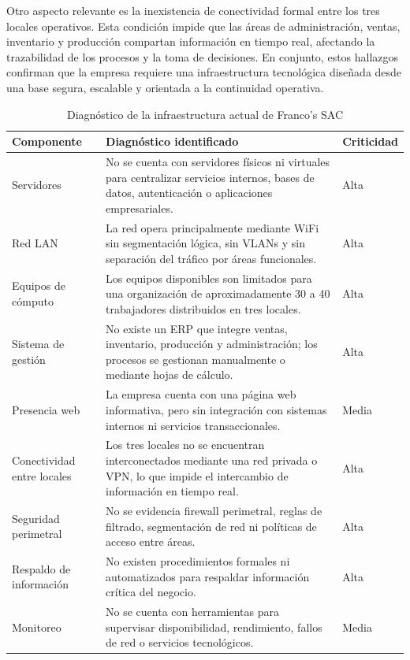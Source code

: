 \documentclass[11pt, a4paper, oneside]{report}
\begin{document}
Otro aspecto relevante es la inexistencia de conectividad formal entre los tres locales operativos. Esta condición impide que las áreas de administración, ventas, inventario y producción compartan información en tiempo real, afectando la trazabilidad de los procesos y la toma de decisiones. En conjunto, estos hallazgos confirman que la empresa requiere una infraestructura tecnológica diseñada desde una base segura, escalable y orientada a la continuidad operativa.

\begin{table}[htbp]
\centering
\caption{Diagnóstico de la infraestructura actual de Franco's SAC}
\small
\renewcommand{\arraystretch}{1.25}
\begin{tabularx}{\textwidth}{|M{3.2cm}|X|N{2cm}|}
\hline
{}
\textbf{Componente} & \textbf{Diagnóstico identificado} & \textbf{Criticidad} \\
\hline
Servidores & No se cuenta con servidores físicos ni virtuales para centralizar servicios internos, bases de datos, autenticación o aplicaciones empresariales. & Alta \\
\hline
Red LAN & La red opera principalmente mediante WiFi sin segmentación lógica, sin VLANs y sin separación del tráfico por áreas funcionales. & Alta \\
\hline
Equipos de cómputo & Los equipos disponibles son limitados para una organización de aproximadamente 30 a 40 trabajadores distribuidos en tres locales. & Alta \\
\hline
Sistema de gestión & No existe un ERP que integre ventas, inventario, producción y administración; los procesos se gestionan manualmente o mediante hojas de cálculo. & Alta \\
\hline
Presencia web & La empresa cuenta con una página web informativa, pero sin integración con sistemas internos ni servicios transaccionales. & Media \\
\hline
Conectividad entre locales & Los tres locales no se encuentran interconectados mediante una red privada o VPN, lo que impide el intercambio de información en tiempo real. & Alta \\
\hline
Seguridad perimetral & No se evidencia firewall perimetral, reglas de filtrado, segmentación de red ni políticas de acceso entre áreas. & Alta \\
\hline
Respaldo de información & No existen procedimientos formales ni automatizados para respaldar información crítica del negocio. & Alta \\
\hline
Monitoreo & No se cuenta con herramientas para supervisar disponibilidad, rendimiento, fallos de red o servicios tecnológicos. & Media \\
\hline
\end{tabularx}
\end{table}
\end{document}

